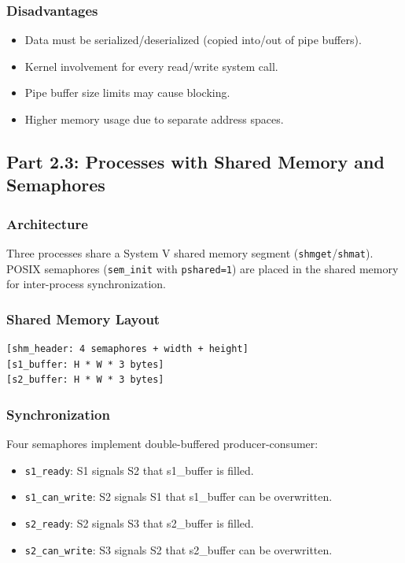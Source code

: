 \documentclass[12pt,a4paper]{article}
\begin{document}
\subsubsection{Disadvantages}
\begin{itemize}
    \item Data must be serialized/deserialized (copied into/out of pipe buffers).
    \item Kernel involvement for every read/write system call.
    \item Pipe buffer size limits may cause blocking.
    \item Higher memory usage due to separate address spaces.
\end{itemize}

\subsection{Part 2.3: Processes with Shared Memory and Semaphores}

\subsubsection{Architecture}
Three processes share a System V shared memory segment (\texttt{shmget}/\texttt{shmat}). POSIX semaphores (\texttt{sem\_init} with \texttt{pshared=1}) are placed in the shared memory for inter-process synchronization.

\subsubsection{Shared Memory Layout}
\begin{verbatim}
[shm_header: 4 semaphores + width + height]
[s1_buffer: H * W * 3 bytes]
[s2_buffer: H * W * 3 bytes]
\end{verbatim}

\subsubsection{Synchronization}
Four semaphores implement double-buffered producer-consumer:
\begin{itemize}
    \item \texttt{s1\_ready}: S1 signals S2 that s1\_buffer is filled.
    \item \texttt{s1\_can\_write}: S2 signals S1 that s1\_buffer can be overwritten.
    \item \texttt{s2\_ready}: S2 signals S3 that s2\_buffer is filled.
    \item \texttt{s2\_can\_write}: S3 signals S2 that s2\_buffer can be overwritten.
\end{itemize}
\end{document}
